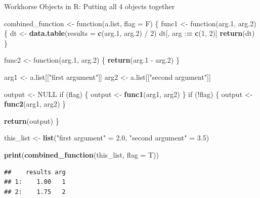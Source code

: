 \documentclass[10pt,ignorenonframetext,]{beamer}
\newenvironment{Shaded}{\begin{snugshade}}{\end{snugshade}}
\newcommand{\KeywordTok}[1]{\textcolor[rgb]{0.13,0.29,0.53}{\textbf{{#1}}}}
\newcommand{\DataTypeTok}[1]{\textcolor[rgb]{0.13,0.29,0.53}{{#1}}}
\newcommand{\DecValTok}[1]{\textcolor[rgb]{0.00,0.00,0.81}{{#1}}}
\newcommand{\FloatTok}[1]{\textcolor[rgb]{0.00,0.00,0.81}{{#1}}}
\newcommand{\StringTok}[1]{\textcolor[rgb]{0.31,0.60,0.02}{{#1}}}
\newcommand{\OtherTok}[1]{\textcolor[rgb]{0.56,0.35,0.01}{{#1}}}
\newcommand{\ErrorTok}[1]{\textcolor[rgb]{0.64,0.00,0.00}{\textbf{{#1}}}}
\newcommand{\NormalTok}[1]{{#1}}
\begin{document}
\begin{frame}[fragile]{Workhorse Objects in R: Putting all 4 objects
together}

\tiny

\begin{Shaded}
\begin{Highlighting}[]
\NormalTok{combined_function <-}\StringTok{ }\NormalTok{function(a.list, }\DataTypeTok{flag =} \NormalTok{F) \{}
  \NormalTok{func1 <-}\StringTok{ }\NormalTok{function(arg}\FloatTok{.1}\NormalTok{, arg}\FloatTok{.2}\NormalTok{) \{}
    \NormalTok{dt <-}\StringTok{ }\KeywordTok{data.table}\NormalTok{(}\DataTypeTok{results =} \KeywordTok{c}\NormalTok{(arg}\FloatTok{.1}\NormalTok{, arg}\FloatTok{.2}\NormalTok{) /}\StringTok{ }\DecValTok{2}\NormalTok{)}
    \NormalTok{dt[, arg :}\ErrorTok{=}\StringTok{ }\KeywordTok{c}\NormalTok{(}\DecValTok{1}\NormalTok{, }\DecValTok{2}\NormalTok{)]}
    \KeywordTok{return}\NormalTok{(dt)}
  \NormalTok{\}}

  \NormalTok{func2 <-}\StringTok{ }\NormalTok{function(arg}\FloatTok{.1}\NormalTok{, arg}\FloatTok{.2}\NormalTok{) \{}
    \KeywordTok{return}\NormalTok{(arg}\FloatTok{.1} \NormalTok{-}\StringTok{ }\NormalTok{arg}\FloatTok{.2}\NormalTok{)}
  \NormalTok{\}}

  \NormalTok{arg1 <-}\StringTok{ }\NormalTok{a.list[[}\StringTok{"first argument"}\NormalTok{]]}
  \NormalTok{arg2 <-}\StringTok{ }\NormalTok{a.list[[}\StringTok{"second argument"}\NormalTok{]]}

  \NormalTok{output <-}\StringTok{ }\OtherTok{NULL}
  \NormalTok{if (flag) \{}
    \NormalTok{output <-}\StringTok{ }\KeywordTok{func1}\NormalTok{(arg1, arg2)}
  \NormalTok{\}}
  \NormalTok{if (!flag) \{}
    \NormalTok{output <-}\StringTok{ }\KeywordTok{func2}\NormalTok{(arg1, arg2)}
  \NormalTok{\}}

  \KeywordTok{return}\NormalTok{(output)}
\NormalTok{\}}

\NormalTok{this_list <-}\StringTok{ }\KeywordTok{list}\NormalTok{(}\StringTok{"first argument"} \NormalTok{=}\StringTok{ }\FloatTok{2.0}\NormalTok{, }\StringTok{"second argument"} \NormalTok{=}\StringTok{ }\FloatTok{3.5}\NormalTok{)}

\KeywordTok{print}\NormalTok{(}\KeywordTok{combined_function}\NormalTok{(this_list, }\DataTypeTok{flag =} \NormalTok{T))}
\end{Highlighting}
\end{Shaded}

\begin{verbatim}
##    results arg
## 1:    1.00   1
## 2:    1.75   2
\end{verbatim}

\normalsize

\end{frame}
\end{document}
